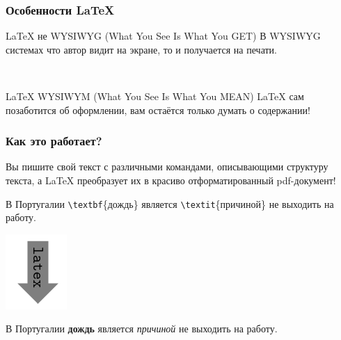 \documentclass[aspectratio=169,newPxFont]{beamer}
\begin{document}


\begin{frame}
\frametitle{Особенности \LaTeX}
\LaTeX{} не WYSIWYG (What You See Is What You GET)
В WYSIWYG системах что автор видит на экране, то и получается на печати.

\mbox{ }

\LaTeX{} WYSIWYM (What You See Is What You \alert{MEAN})
\LaTeX{} сам позаботится об оформлении, вам остаётся только думать о содержании!
\end{frame}



\begin{frame}[fragile]
\frametitle{Как это работает?}
Вы пишите свой текст с различными \alert{командами}, описывающими структуру текста, а \LaTeX{} преобразует их в красиво отформатированный pdf-документ!

\begin{mdframed}[backgroundcolor=LTXLightGreen]
В Португалии \verb|\textbf|\{дождь\} является \verb|\textit|\{причиной\}  не выходить на работу.
\end{mdframed}

\centering
   \includegraphics[scale=0.3]{fuc.png}%

\begin{mdframed}[backgroundcolor=LTXLightGreen]
В Португалии \textbf{дождь} является \textit{причиной} не выходить на работу.
\end{mdframed}
\end{frame}
\end{document}
